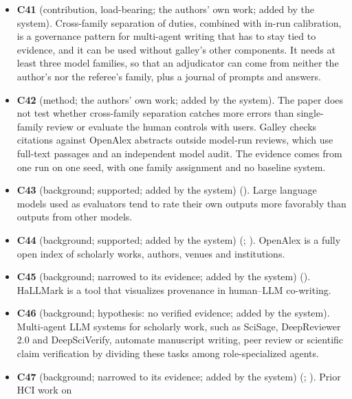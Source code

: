\documentclass[
]{article}
\begin{document}
\begin{itemize}
  reformulations, verifies claim-level citation passages, judges referee
  responses, adjudicates disputes and reconciles the final manuscript.
\item
  \textbf{C41} (contribution, load-bearing; the authors' own work; added
  by the system). Cross-family separation of duties, combined with
  in-run calibration, is a governance pattern for multi-agent writing
  that has to stay tied to evidence, and it can be used without galley's
  other components. It needs at least three model families, so that an
  adjudicator can come from neither the author's nor the referee's
  family, plus a journal of prompts and answers.
\item
  \textbf{C42} (method; the authors' own work; added by the system). The
  paper does not test whether cross-family separation catches more
  errors than single-family review or evaluate the human controls with
  users. Galley checks citations against OpenAlex abstracts outside
  model-run reviews, which use full-text passages and an independent
  model audit. The evidence comes from one run on one seed, with one
  family assignment and no baseline system.
\item
  \textbf{C43} (background; supported; added by the system)
  (). Large language
  models used as evaluators tend to rate their own outputs more
  favorably than outputs from other models.
\item
  \textbf{C44} (background; supported; added by the system)
  (;
  ). OpenAlex is a
  fully open index of scholarly works, authors, venues and institutions.
\item
  \textbf{C45} (background; narrowed to its evidence; added by the
  system) ().
  HaLLMark is a tool that visualizes provenance in human--LLM
  co-writing.
\item
  \textbf{C46} (background; hypothesis: no verified evidence; added by
  the system). Multi-agent LLM systems for scholarly work, such as
  SciSage, DeepReviewer 2.0 and DeepSciVerify, automate manuscript
  writing, peer review or scientific claim verification by dividing
  these tasks among role-specialized agents.
\item
  \textbf{C47} (background; narrowed to its evidence; added by the
  system) (;
  ). Prior HCI work on

\end{itemize}
\end{document}
